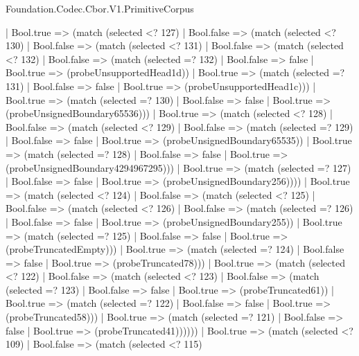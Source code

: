 \begin{lexlean}{Foundation.Codec.Cbor.V1.PrimitiveCorpus}
\begin{semanticmodule}
{          | Bool.true => (match (selected <? 127)
            | Bool.false => (match (selected <? 130)
              | Bool.false => (match (selected <? 131)
                | Bool.false => (match (selected <? 132)
                  | Bool.false => (match (selected =? 132)
                    | Bool.false => false
                    | Bool.true => (probeUnsupportedHead1d))
                  | Bool.true => (match (selected =? 131)
                    | Bool.false => false
                    | Bool.true => (probeUnsupportedHead1c)))
                | Bool.true => (match (selected =? 130)
                  | Bool.false => false
                  | Bool.true => (probeUnsignedBoundary65536)))
              | Bool.true => (match (selected <? 128)
                | Bool.false => (match (selected <? 129)
                  | Bool.false => (match (selected =? 129)
                    | Bool.false => false
                    | Bool.true => (probeUnsignedBoundary65535))
                  | Bool.true => (match (selected =? 128)
                    | Bool.false => false
                    | Bool.true => (probeUnsignedBoundary4294967295)))
                | Bool.true => (match (selected =? 127)
                  | Bool.false => false
                  | Bool.true => (probeUnsignedBoundary256))))
            | Bool.true => (match (selected <? 124)
              | Bool.false => (match (selected <? 125)
                | Bool.false => (match (selected <? 126)
                  | Bool.false => (match (selected =? 126)
                    | Bool.false => false
                    | Bool.true => (probeUnsignedBoundary255))
                  | Bool.true => (match (selected =? 125)
                    | Bool.false => false
                    | Bool.true => (probeTruncatedEmpty)))
                | Bool.true => (match (selected =? 124)
                  | Bool.false => false
                  | Bool.true => (probeTruncated78)))
              | Bool.true => (match (selected <? 122)
                | Bool.false => (match (selected <? 123)
                  | Bool.false => (match (selected =? 123)
                    | Bool.false => false
                    | Bool.true => (probeTruncated61))
                  | Bool.true => (match (selected =? 122)
                    | Bool.false => false
                    | Bool.true => (probeTruncated58)))
                | Bool.true => (match (selected =? 121)
                  | Bool.false => false
                  | Bool.true => (probeTruncated41))))))
        | Bool.true => (match (selected <? 109)
          | Bool.false => (match (selected <? 115)
}
\end{semanticmodule}
\end{lexlean}
